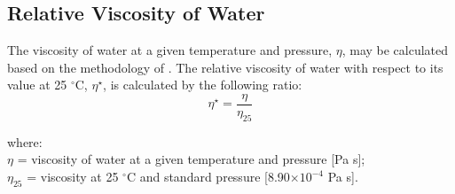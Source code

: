 \subsection{Relative Viscosity of Water}
\label{sec:eta}
The viscosity of water at a given temperature and pressure, $\eta$, may be calculated based on the methodology of \cite{huber09}. 
The relative viscosity of water with respect to its value at 25 ${}^\circ$C, $\eta^\star$, is calculated by the following ratio:
%
\begin{equation}
\label{eq:ns}
    \eta^\star = \frac{\eta}{\eta_{25}}
\end{equation}

\noindent where:\\
\indent $\eta$ = viscosity of water at a given temperature and pressure [Pa s];\\
\indent $\eta_{25}$ = viscosity at 25 ${}^\circ$C and standard pressure [8.90$\times 10^{-4}$ Pa s].\\

